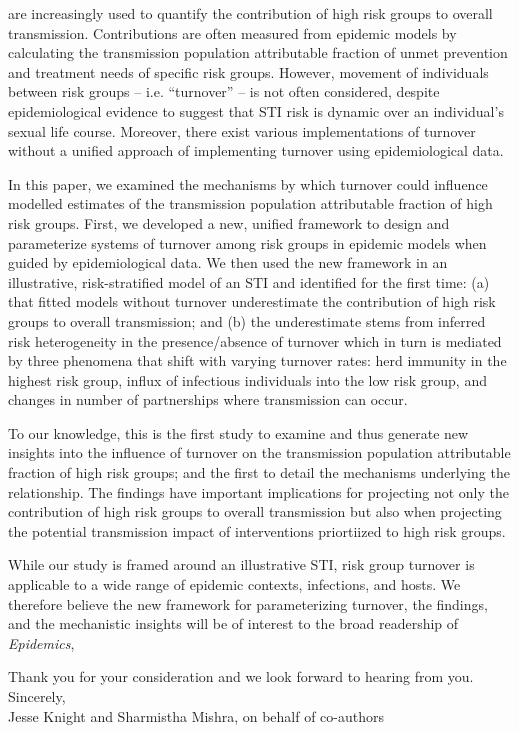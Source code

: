 \documentclass[a4]{article}
\begin{document}
are increasingly used to 
quantify the contribution of high risk groups to overall transmission.
Contributions are often measured from epidemic models 
by calculating the transmission population attributable 
fraction of unmet prevention and treatment needs of specific risk groups.
However, movement of individuals between risk groups
-- i.e. ``turnover'' --					%
is not often considered, despite epidemiological evidence to suggest 
that STI risk is dynamic over an individual's sexual life course.
Moreover, there exist various implementations of turnover without
a unified approach of implementing turnover using epidemiological data.		
\par
In this paper, we examined the mechanisms by which turnover could
influence modelled estimates of the transmission population 
attributable fraction of high risk groups. First, we developed
a new, unified framework to design and parameterize
systems of turnover among risk groups in epidemic models when
guided by epidemiological data. We then 
used the new framework in an illustrative, risk-stratified model of an STI
and identified for the first time: (a) that fitted models without turnover underestimate
the contribution of high risk groups to overall transmission; and (b) 
the underestimate stems from inferred 
risk heterogeneity in the presence/absence of turnover which in turn is mediated by
three phenomena that shift with varying turnover rates: herd immunity 
in the highest risk group, influx of infectious individuals into the low risk group,
and changes in number of partnerships where transmission can occur.

\par
To our knowledge, this is the first study to examine and thus generate new insights 
into the influence of turnover
on the transmission population attributable fraction of high risk groups; and the first
to detail the mechanisms underlying the relationship. The findings have important
implications for projecting not only the contribution of high risk groups to overall transmission 
but also when projecting the potential transmission impact of interventions priortiized to high risk groups.

\par
While our study is framed around an illustrative STI,
risk group turnover is applicable to a wide range of 
epidemic contexts, infections, and hosts. 
We therefore believe the new framework for parameterizing turnover, 
the findings, and the mechanistic insights will be of interest to the broad readership of
 \textit{Epidemics},


\par
Thank you for your consideration and we look forward to hearing from you.
\\[2em]
Sincerely,\\[1em]
Jesse Knight and Sharmistha Mishra, on behalf of co-authors
\end{document}
